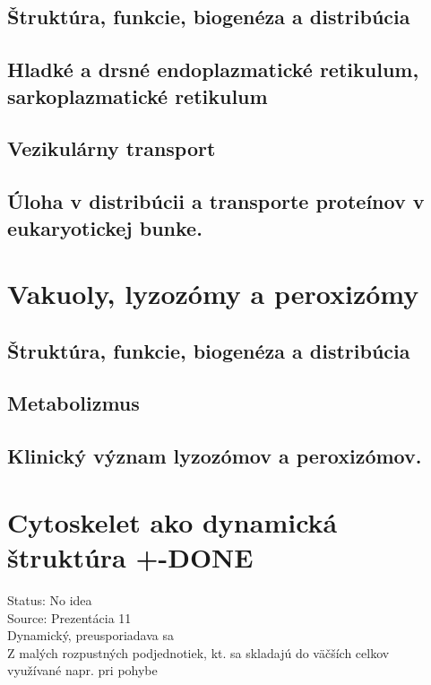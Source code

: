 \subsection{Štruktúra, funkcie, biogenéza a distribúcia}

\subsection{Hladké a drsné endoplazmatické retikulum, sarkoplazmatické retikulum}

\subsection{Vezikulárny transport}

\subsection{Úloha v distribúcii a transporte proteínov v eukaryotickej bunke.}

\section{Vakuoly, lyzozómy a peroxizómy}

\subsection{Štruktúra, funkcie, biogenéza a distribúcia}

\subsection{Metabolizmus}

\subsection{Klinický význam lyzozómov a peroxizómov. }

\section{Cytoskelet ako dynamická štruktúra +-DONE}

Status: No idea\\
Source: Prezentácia 11\\

Dynamický, preusporiadava sa\\
Z malých rozpustných podjednotiek, kt. sa skladajú do väčších celkov\\
\tab využívané napr. pri pohybe\\
